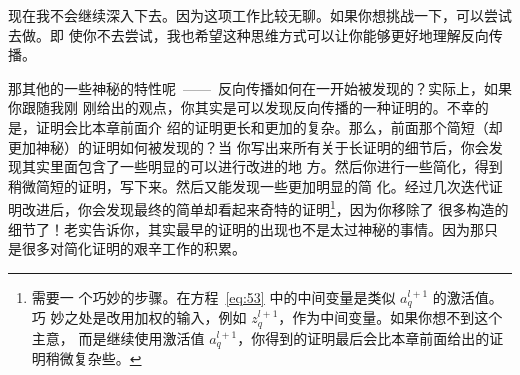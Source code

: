 现在我不会继续深入下去。因为这项工作比较无聊。如果你想挑战一下，可以尝试去做。即
使你不去尝试，我也希望这种思维方式可以让你能够更好地理解反向传播。

那其他的一些神秘的特性呢~——~反向传播如何在一开始被发现的？实际上，如果你跟随我刚
刚给出的观点，你其实是可以发现反向传播的一种证明的。不幸的是，证明会比本章前面介
绍的证明更长和更加的复杂。那么，前面那个简短（却更加神秘）的证明如何被发现的？当
你写出来所有关于长证明的细节后，你会发现其实里面包含了一些明显的可以进行改进的地
方。然后你进行一些简化，得到稍微简短的证明，写下来。然后又能发现一些更加明显的简
化。经过几次迭代证明改进后，你会发现最终的简单却看起来奇特的证明\footnote{需要一
  个巧妙的步骤。在方程~\eqref{eq:53} 中的中间变量是类似 $a_q^{l+1}$ 的激活值。巧
  妙之处是改用加权的输入，例如 $z^{l+1}_q$，作为中间变量。如果你想不到这个主意，
  而是继续使用激活值
  $a_q^{l+1}$，你得到的证明最后会比本章前面给出的证明稍微复杂些。}，因为你移除了
很多构造的细节了！老实告诉你，其实最早的证明的出现也不是太过神秘的事情。因为那只
是很多对简化证明的艰辛工作的积累。
